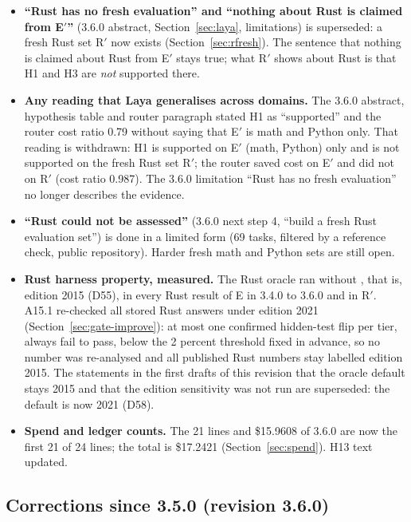 \documentclass[11pt,a4paper]{article}
\newcommand{\code}[1]{\texttt{\detokenize{#1}}}
\begin{document}
\begin{itemize}
\item \textbf{``Rust has no fresh evaluation'' and ``nothing about Rust is claimed from E$'$''} (3.6.0 abstract, Section~\ref{sec:laya}, limitations) is superseded: a fresh Rust set R$'$ now exists (Section~\ref{sec:rfresh}). The sentence that nothing is claimed about Rust from E$'$ stays true; what R$'$ shows about Rust is that H1 and H3 are \emph{not} supported there.
\item \textbf{Any reading that Laya generalises across domains.} The 3.6.0 abstract, hypothesis table and router paragraph stated H1 as ``supported'' and the router cost ratio 0.79 without saying that E$'$ is math and Python only. That reading is withdrawn: H1 is supported on E$'$ (math, Python) only and is not supported on the fresh Rust set R$'$; the router saved cost on E$'$ and did not on R$'$ (cost ratio 0.987). The 3.6.0 limitation ``Rust has no fresh evaluation'' no longer describes the evidence.
\item \textbf{``Rust could not be assessed''} (3.6.0 next step 4, ``build a fresh Rust evaluation set'') is done in a limited form (69 tasks, filtered by a reference check, public repository). Harder fresh math and Python sets are still open.
\item \textbf{Rust harness property, measured.} The Rust oracle ran \code{rustc} without \code{--edition}, that is, edition 2015 (D55), in every Rust result of E in 3.4.0 to 3.6.0 and in R$'$. A15.1 re-checked all stored Rust answers under edition 2021 (Section~\ref{sec:gate-improve}): at most one confirmed hidden-test flip per tier, always fail to pass, below the 2 percent threshold fixed in advance, so no number was re-analysed and all published Rust numbers stay labelled edition 2015. The statements in the first drafts of this revision that the oracle default stays 2015 and that the edition sensitivity was not run are superseded: the default is now 2021 (D58).
\item \textbf{Spend and ledger counts.} The 21 lines and \$15.9608 of 3.6.0 are now the first 21 of 24 lines; the total is \$17.2421 (Section~\ref{sec:spend}). H13 text updated.
\end{itemize}

\subsection{Corrections since 3.5.0 (revision 3.6.0)}\label{sec:corr360}
\end{document}
